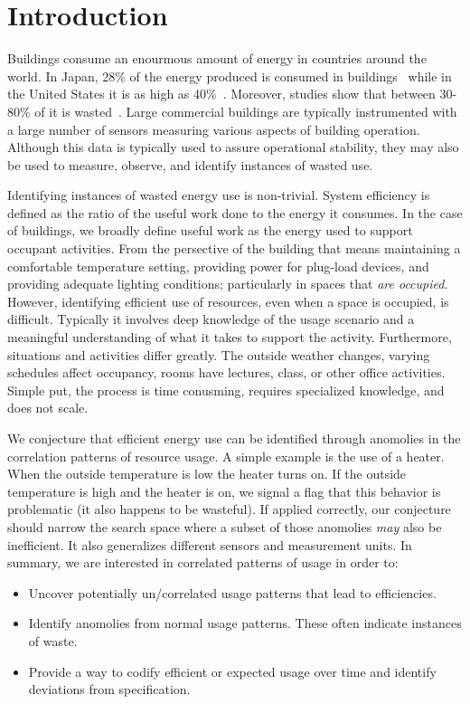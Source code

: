 \section{Introduction}
Buildings consume an enourmous amount of energy in countries around the world.  In 
Japan, 28\% of the energy produced is consumed in buildings~\cite{japanbuildings} while in the United 
States it is as high as 40\%~\cite{epabuildings}.  Moreover, studies show that between 30-80\% of it
is wasted~\cite{waste_science, next10_waste}.  Large commercial buildings are typically instrumented
with a large number of sensors measuring various aspects of building operation.  Although this data is
typically used to assure operational stability, they may also be used to measure, observe, and identify
instances of wasted use.

Identifying instances of wasted energy use is non-trivial.  System efficiency is defined as the ratio of the 
useful work done to the energy it consumes.  In the case of buildings, we broadly define useful work as 
the energy used to support occupant activities.  From the persective of the building that means maintaining
a comfortable temperature setting, providing power for plug-load devices, and providing adequate lighting
conditions; particularly in spaces that \emph{are occupied}.  However, identifying efficient use of resources,
even when a space is occupied, is difficult.  Typically it involves deep knowledge of the usage scenario and
a meaningful understanding of what it takes to support the activity.  Furthermore, situations and activities differ
greatly.  The outside weather changes, varying schedules affect occupancy, rooms have lectures, class,
or other office activities.  Simple put, the process is time conusming, requires specialized knowledge,
and does not scale.

We conjecture that efficient energy use can be identified through anomolies in the correlation
patterns of resource usage.  A simple example is the use of a heater.  When the outside temperature is low
the heater turns on.  If the outside temperature is high and the heater is on, we signal a flag that this
behavior is problematic (it also happens to be wasteful).  If applied correctly, our conjecture should narrow
the search space where a subset of those anomolies \emph{may} also be inefficient.
It also generalizes different sensors and measurement units.  In summary, we are interested
in correlated patterns of usage in order to:

\begin{itemize}
\item Uncover potentially un/correlated usage patterns that lead to efficiencies.
\item Identify anomolies from normal usage patterns.  These often indicate instances of waste.
\item Provide a way to codify efficient or expected usage over time and identify deviations
		from specification.
\end{itemize}

